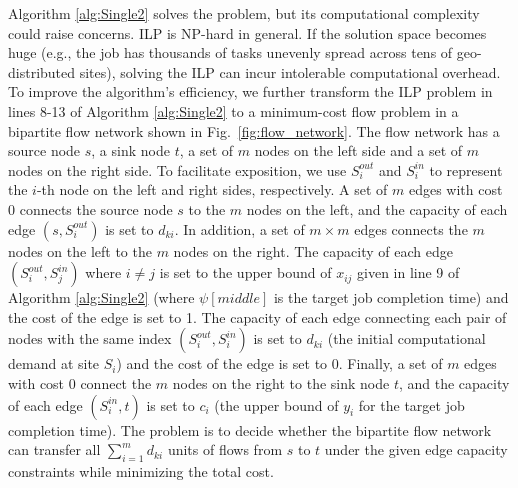 Algorithm \ref{alg:Single2} solves the problem, but its computational complexity could raise concerns. 
ILP is NP-hard in general. If the solution space becomes huge (e.g., the job has thousands of tasks unevenly spread across tens of geo-distributed sites), solving the ILP can incur intolerable computational overhead. To improve the algorithm's efficiency, we further transform the ILP problem in lines 8-13 of Algorithm \ref{alg:Single2} to a minimum-cost flow problem in a bipartite flow network shown in Fig.~\ref{fig:flow_network}. The flow network has a source node $s$, a sink node $t$, a set of $m$ nodes on the left side and a set of $m$ nodes on the right side. To facilitate exposition, we use $S^{out}_i$ and $S^{in}_i$ to represent the $i$-th node on the left and right sides, respectively. A set of $m$ edges with cost 0 connects the source node $s$ to the $m$ nodes on the left, and the capacity of each edge $(s, S_i^{out})$ is set to $d_{ki}$. In addition, a set of $m\times m$ edges connects the $m$ nodes on the left to the $m$ nodes on the right. The capacity of each edge $(S_i^{out},S_j^{in})$ where $i\neq j$ is set to the upper bound of $x_{ij}$ given in line 9 of Algorithm \ref{alg:Single2} (where $\psi[middle]$ is the target job completion time) and the cost of the edge is set to 1. The capacity of each edge connecting each pair of nodes with the same index $(S^{out}_i, S^{in}_i)$ is set to $d_{ki}$ (the initial computational demand at site $S_i$) and the cost of the edge is set to 0. Finally, a set of $m$ edges with cost 0 connect the $m$ nodes on the right to the sink node $t$, and the capacity of each edge $(S^{in}_i, t)$ is set to $c_i$ (the upper bound of $y_i$ for the target job completion time). The problem is to decide whether the bipartite flow network can transfer all $\sum_{i=1}^m d_{ki}$ units of flows from $s$ to $t$ under the given edge capacity constraints while minimizing the total cost. 

